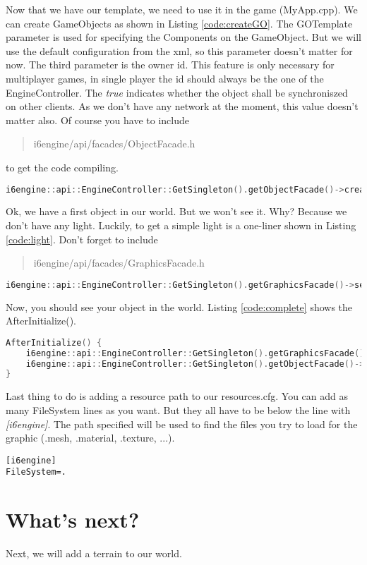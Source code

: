 \documentclass{article}
\begin{document}
Now that we have our template, we need to use it in the game (MyApp.cpp). We can create GameObjects as shown in Listing \ref{code:createGO}. The GOTemplate parameter is used for specifying the Components on the GameObject. But we will use the default configuration from the xml, so this parameter doesn't matter for now. The third parameter is the owner id. This feature is only necessary for multiplayer games, in single player the id should always be the one of the EngineController. The \textit{true} indicates whether the object shall be synchroniszed on other clients. As we don't have any network at the moment, this value doesn't matter also. Of course you have to include \begin{quote}i6engine/api/facades/ObjectFacade.h\end{quote} to get the code compiling.
\begin{lstlisting}[language=C++, style=basic, caption={creating objects}, label=code:createGO]
i6engine::api::EngineController::GetSingleton().getObjectFacade()->createObject("Tutorial", i6engine::api::objects::GOTemplate(), i6engine::api::EngineController::GetSingleton().getUuid(), true);
\end{lstlisting}
Ok, we have a first object in our world. But we won't see it. Why? Because we don't have any light. Luckily, to get a simple light is a one-liner shown in Listing \ref{code:light}. Don't forget to include \begin{quote}i6engine/api/facades/GraphicsFacade.h\end{quote}
\begin{lstlisting}[language=C++, style=basic, caption={adding lights}, label=code:light]
i6engine::api::EngineController::GetSingleton().getGraphicsFacade()->setAmbientLight(1.0, 1.0, 1.0);
\end{lstlisting}
Now, you should see your object in the world. Listing \ref{code:complete} shows the AfterInitialize().
\begin{lstlisting}[language=C++, style=basic, caption={AfterInitialize()}, label=code:complete]
AfterInitialize() {
	i6engine::api::EngineController::GetSingleton().getGraphicsFacade()->setAmbientLight(1.0, 1.0, 1.0);
	i6engine::api::EngineController::GetSingleton().getObjectFacade()->createObject("Tutorial", i6engine::api::objects::GOTemplate(), i6engine::api::EngineController::GetSingleton().getUuid(), true);
}
\end{lstlisting}

Last thing to do is adding a resource path to our resources.cfg. You can add as many FileSystem lines as you want. But they all have to be below the line with \textit{[i6engine]}. The path specified will be used to find the files you try to load for the graphic (.mesh, .material, .texture, ...).
\begin{lstlisting}[style=basic, caption={resource.cfg}, label=code:resourcecfg]
[i6engine]
FileSystem=.
\end{lstlisting}

\section{What's next?}

Next, we will add a terrain to our world.
\end{document}
